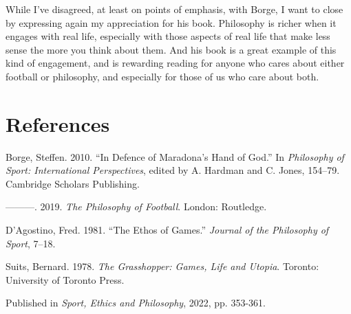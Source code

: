 \documentclass[
  11pt,
  letterpaper,
  DIV=11,
  numbers=noendperiod,
  twoside]{scrartcl}
\newlength{\cslhangindent}
\newenvironment{CSLReferences}[2] %
 {\begin{list}{}{%
  \setlength{\itemindent}{0pt}
  \setlength{\leftmargin}{0pt}
  \setlength{\parsep}{0pt}
  \ifodd #1
   \setlength{\leftmargin}{\cslhangindent}
   \setlength{\itemindent}{-1\cslhangindent}
  \fi
  \setlength{\itemsep}{#2\baselineskip}}}
 {\end{list}}
\begin{document}
While I've disagreed, at least on points of emphasis, with Borge, I want
to close by expressing again my appreciation for his book. Philosophy is
richer when it engages with real life, especially with those aspects of
real life that make less sense the more you think about them. And his
book is a great example of this kind of engagement, and is rewarding
reading for anyone who cares about either football or philosophy, and
especially for those of us who care about both.

\section*{References}\label{references}

\label{refs}
\begin{CSLReferences}{1}{0}
Borge, Steffen. 2010. {``In Defence of Maradona's Hand of God.''} In
\emph{Philosophy of Sport: International Perspectives}, edited by A.
Hardman and C. Jones, 154--79. Cambridge Scholars Publishing.

---------. 2019. \emph{The Philosophy of Football}. London: Routledge.

D'Agostino, Fred. 1981. {``The Ethos of Games.''} \emph{Journal of the
Philosophy of Sport}, 7--18.

Suits, Bernard. 1978. \emph{The Grasshopper: Games, Life and Utopia}.
Toronto: University of Toronto Press.

\end{CSLReferences}



\noindent Published in\emph{
Sport, Ethics and Philosophy}, 2022, pp. 353-361.
\end{document}
